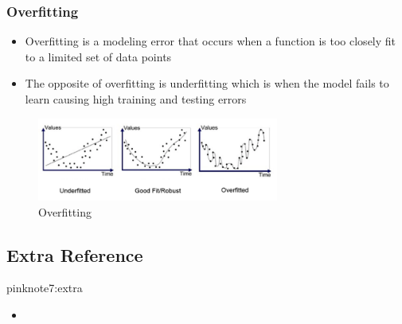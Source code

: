 \documentclass{tron}
\newcommand{\uhref}[2]{\underline{\href{#2}{\color{orange}{#1}}}}
\begin{document}
\subsubsection{Overfitting}
\begin{itemize}
	\item Overfitting is a modeling error that occurs when a function is too closely fit to a limited set of data points
	\item The opposite of overfitting is underfitting which is when the model fails to learn causing high training and testing errors
\end{itemize}
\begin{figure}[H]
	\center
	\includegraphics[width=300px]{Figs/CNN/overfit}
	\caption{Overfitting}
\end{figure}

\subsection{Extra Reference}
\begin{note}{pink}{note7:extra}
	\begin{itemize}
		\item \uhref{CNN}{https://cs231n.github.io/convolutional-networks/}
	\end{itemize}
\end{note}


\end{document}
